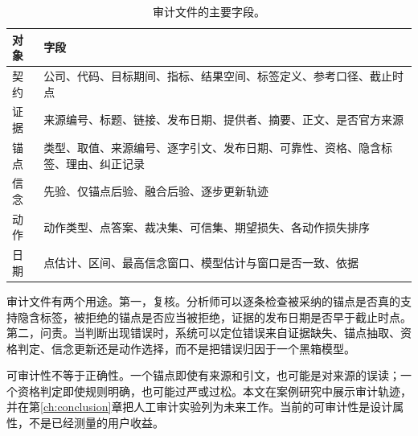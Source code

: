 \begin{table}[H]
\centering
{}
\caption{审计文件的主要字段。}
\label{tab:auditfields}
\begin{tabular}{p{2.8cm}p{8.8cm}}
\toprule
对象 & 字段 \\
\midrule
契约 & 公司、代码、目标期间、指标、结果空间、标签定义、参考口径、截止时点 \\
证据 & 来源编号、标题、链接、发布日期、提供者、摘要、正文、是否官方来源 \\
锚点 & 类型、取值、来源编号、逐字引文、发布日期、可靠性、资格、隐含标签、理由、纠正记录 \\
信念 & 先验、仅锚点后验、融合后验、逐步更新轨迹 \\
动作 & 动作类型、点答案、裁决集、可信集、期望损失、各动作损失排序 \\
日期 & 点估计、区间、最高信念窗口、模型估计与窗口是否一致、依据 \\
\bottomrule
\end{tabular}
\end{table}

审计文件有两个用途。第一，复核。分析师可以逐条检查被采纳的锚点是否真的支持隐含标签，被拒绝的锚点是否应当被拒绝，证据的发布日期是否早于截止时点。第二，问责。当判断出现错误时，系统可以定位错误来自证据缺失、锚点抽取、资格判定、信念更新还是动作选择，而不是把错误归因于一个黑箱模型。

可审计性不等于正确性。一个锚点即使有来源和引文，也可能是对来源的误读；一个资格判定即使规则明确，也可能过严或过松。本文在案例研究中展示审计轨迹，并在第\ref{ch:conclusion}章把人工审计实验列为未来工作。当前的可审计性是设计属性，不是已经测量的用户收益。
